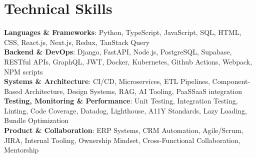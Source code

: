 \documentclass[letterpaper,10pt]{article}
\begin{document}
\section{Technical Skills}
\begin{itemize}[leftmargin=0.15in, label={}] %
    \small{\item{ %
        \textbf{Languages \& Frameworks}{: Python, TypeScript, JavaScript, SQL, HTML, CSS, React.js, Next.js, Redux, TanStack Query} \\
        \textbf{Backend \& DevOps}{: Django, FastAPI, Node.js, PostgreSQL, Supabase, RESTful APIs, GraphQL, JWT, Docker, Kubernetes, Github Actions, Webpack, NPM scripts} \\
        \textbf{Systems \& Architecture}{: CI/CD, Microservices, ETL Pipelines, Component-Based Architecture, Design Systems, RAG, AI Tooling, PaaS\/SaaS integration} \\
        \textbf{Testing, Monitoring \& Performance}{: Unit Testing, Integration Testing, Linting, Code Coverage, Datadog, Lighthouse, A11Y Standards, Lazy Loading, Bundle Optimization} \\
        \textbf{Product \& Collaboration}{: ERP Systems, CRM Automation, Agile/Scrum, JIRA, Internal Tooling, Ownership Mindset, Cross-Functional Collaboration, Mentorship}
    }}
\end{itemize}

\end{document}
